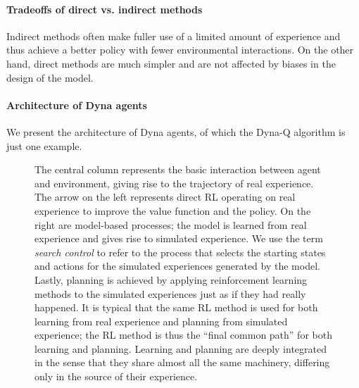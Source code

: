 \documentclass[12pt]{article}
\begin{document}
\paragraph{Tradeoffs of direct vs. indirect methods} Indirect methods often make fuller use of a limited amount of experience and thus achieve a better policy with fewer environmental interactions. On the other hand, direct methods are much simpler and are not affected by biases in the design of the model.

\paragraph{Architecture of Dyna agents} We present the architecture of Dyna agents, of which the Dyna-Q algorithm is just one example.

\begin{figure}[h]
  \centering
\caption{\footnotesize The central column represents the basic interaction between agent and environment, giving rise to the trajectory of real experience. The arrow on the left represents direct RL operating on real experience to improve the value function and the policy. On the right are model-based processes; the model is learned from real experience and gives rise to simulated experience. We use the term \emph{search control} to refer to the process that selects the starting states and actions for the simulated experiences generated by the model. Lastly, planning is achieved by applying reinforcement learning methods to the simulated experiences just as if they had really happened. It is typical that the same RL method is used for both learning from real experience and planning from simulated experience; the RL method is thus the ``final common path'' for both learning and planning. Learning and planning are deeply integrated in the sense that they share almost all the same machinery, differing only in the source of their experience.}

\end{figure}
\end{document}

